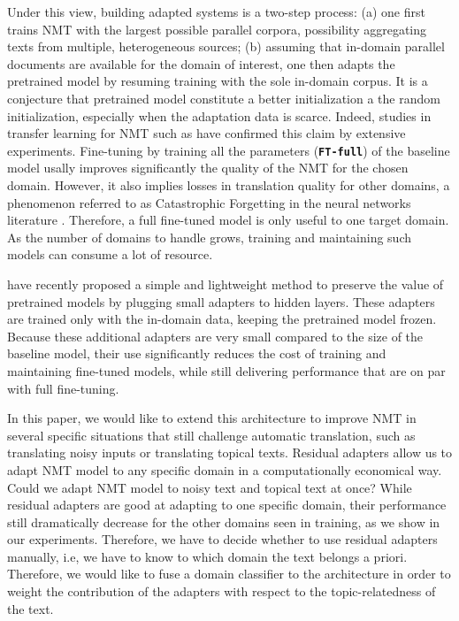 \documentclass[11pt,a4paper]{article}
\newcommand{\fyTodo}[1]{\Todo[FY:]{\textcolor{orange}{#1}}}
\newcommand{\system}[1]{\texttt{\textbf{#1}}}
\begin{document}
Under this view, building adapted systems is a two-step process: (a) one first trains NMT with the largest possible parallel corpora, possibility aggregating texts from multiple, heterogeneous sources; (b) assuming that in-domain parallel documents are available for the domain of interest, one then adapts the pretrained model by resuming training with the sole in-domain corpus. It is a conjecture that pretrained model constitute a better initialization a the random initialization, especially when the adaptation data is scarce. Indeed, studies in transfer learning for NMT such as \cite{artetxe20cross,aji20neural} have confirmed this claim by extensive experiments. Fine-tuning by training all the parameters (\system{FT-full}) of the baseline model usally improves significantly the quality of the NMT for the chosen domain. However, it also implies losses in translation quality for other domains, a phenomenon referred to as Catastrophic Forgetting in the neural networks literature \cite{McCloskey89catastrophic}. Therefore, a full fine-tuned model is only useful to one target domain. As the number of domains to handle grows, training and maintaining such models can consume a lot of resource.\fyTodo{Fix this sentence}

\cite{Vilar18learning,bapna19simple} have recently proposed a simple and lightweight method to preserve the value of pretrained models by plugging small adapters to hidden layers. These adapters are trained only with the in-domain data, keeping the pretrained model frozen. Because these additional adapters are very small compared to the size of the baseline model, their use significantly reduces the cost of training and maintaining fine-tuned models, while still delivering performance that are on par with full fine-tuning.

In this paper, we would like to extend this architecture to improve NMT in several specific situations that still challenge automatic translation, such as translating noisy inputs or translating topical texts\fyTodo{??}. Residual adapters allow us to adapt NMT model to any specific domain in a computationally economical way. Could we adapt NMT model to noisy text and topical text at once? While residual adapters are good at adapting to one specific domain, their performance still dramatically decrease for the other domains seen in training, as we show in our experiments. Therefore, we have to decide whether to use residual adapters manually, i.e, we have to know to which domain the text belongs a priori. Therefore, we would like to fuse a domain classifier to the architecture in order to weight the contribution of the adapters with respect to the topic-relatedness of the text.\fyTodo{Say differently: various implementations}
\end{document}

